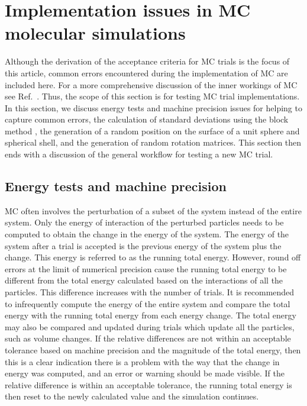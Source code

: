 \documentclass[
  9pt,
  bestpractices,
  pubversion,
]{livecoms}
\begin{document}
\section{\label{sec:common_issues}Implementation issues in MC molecular simulations}

Although the derivation of the acceptance criteria for MC trials is the focus of this article, common errors encountered during the implementation of MC are included here.
For a more comprehensive discussion of the inner workings of MC see Ref.~\cite{dubbeldam_inner_2013}.
Thus, the scope of this section is for testing MC trial implementations.
In this section, we discuss energy tests and machine precision issues for helping to capture common errors, the calculation of standard deviations using the block method \cite{flyvbjerg_error_1989, grossfield_best_2018}, the generation of a random position on the surface of a unit sphere and spherical shell, and the generation of random rotation matrices.
This section then ends with a discussion of the general workflow for testing a new MC trial.

\subsection{\label{sec:energy_test}Energy tests and machine precision}

MC often involves the perturbation of a subset of the system instead of the entire system.
Only the energy of interaction of the perturbed particles needs to be computed to obtain the change in the energy of the system.
The energy of the system after a trial is accepted is the previous energy of the system plus the change.
This energy is referred to as the running total energy.
However, round off errors at the limit of numerical precision cause the running total energy to be different from the total energy calculated based on the interactions of all the particles.
This difference increases with the number of trials.
It is recommended to infrequently compute the energy of the entire system and compare the total energy with the running total energy from each energy change.
The total energy may also be compared and updated during trials which update all the particles, such as volume changes.
If the relative differences are not within an acceptable tolerance based on machine precision and the magnitude of the total energy, then this is a clear indication there is a problem with the way that the change in energy was computed, and an error or warning should be made visible.
If the relative difference is within an acceptable tolerance, the running total energy is then reset to the newly calculated value and the simulation continues.
\end{document}
